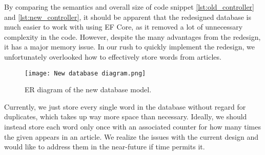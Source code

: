 By comparing the semantics and overall size of code snippet \ref{lst:old_controller} and \ref{lst:new_controller}, it should be apparent that the redesigned database is much easier to work with using EF Core, as it removed a lot of unnecessary complexity in the code.
However, despite the many advantages from the redesign, it has a major memory issue.
In our rush to quickly implement the redesign, we unfortunately overlooked how to effectively store words from articles. 

\begin{figure}[h]
    \centering
    \texttt{[image: New database diagram.png]}
    \caption{ER diagram of the new database model.}
    \label{newdatabaseER}
\end{figure}

Currently, we just store every single word in the database without regard for duplicates, which takes up way more space than necessary.
Ideally, we should instead store each word only once with an associated counter for how many times the given appears in an article.
We realize the issues with the current design and would like to address them in the near-future if time permits it.

